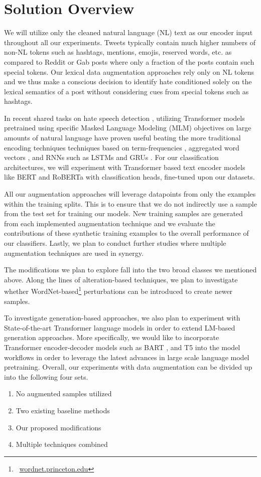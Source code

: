 \documentclass[11pt,a4paper]{article}
\begin{document}
\section{Solution Overview}
We will utilize only the cleaned natural language (NL) text as our encoder input throughout all our experiments. Tweets typically contain much higher numbers of non-NL tokens such as hashtags, mentions, emojis, reserved words, etc. as compared to Reddit or Gab posts \cite{benchmark} where only a fraction of the posts contain such special tokens. Our lexical data augmentation approaches rely only on NL tokens and we thus make a conscious decision to identify hate conditioned solely on the lexical semantics of a post without considering cues from special tokens such as hashtags.

In recent shared tasks on hate speech detection \cite{Poletto2020ResourcesAB, hasoc2020overview, hasoc2019}, utilizing Transformer models \cite{vaswani2017attention} pretrained using specific Masked Language Modeling (MLM) objectives on large amounts of natural language have proven useful \cite{tapt-tathagata, hasoc-sayar} beating the more traditional encoding techniques techniques based on term-frequencies \cite{gaydhani2018detecting, gitari2015lexicon}, aggregated word vectors \cite{arora2016simple}, and RNNs such as LSTMs and GRUs \cite{badjatiya2017dlhate, Bisht2020}. For our classification architectures, we will experiment with Transformer based text encoder models like BERT \cite{devlin2018bert} and RoBERTa \cite{roberta} with classification heads, fine-tuned upon our datasets.

All our augmentation approaches will leverage datapoints from only the examples within the training splits. This is to ensure that we do not indirectly use a sample from the test set for training our models. New training samples are generated from each implemented augmentation technique and we evaluate the contributions of these synthetic training examples to the overall performance of our classifiers. Lastly, we plan to conduct further studies where multiple augmentation techniques are used in synergy. 

The modifications we plan to explore fall into the two broad classes we mentioned above. Along the lines of alteration-based techniques, we plan to investigate whether WordNet-based\footnote{\ \url{wordnet.princeton.edu}} \cite{wordnet} perturbations can be introduced to create newer samples. 

To investigate generation-based approaches, we also plan to experiment with State-of-the-art Transformer language models in order to extend LM-based generation approaches. More specifically, we would like to incorporate Transformer encoder-decoder models such as BART \cite{bart}, and T5 \cite{T5} into the model workflows in order to leverage the latest advances in large scale language model pretraining. Overall, our experiments with data augmentation can be divided up into the following four sets.

\begin{enumerate}
    \itemsep-0.3em 
    \item No augmented samples utilized
    \item Two existing baseline methods
    \item Our proposed modifications
    \item Multiple techniques combined
\end{enumerate}



\end{document}
